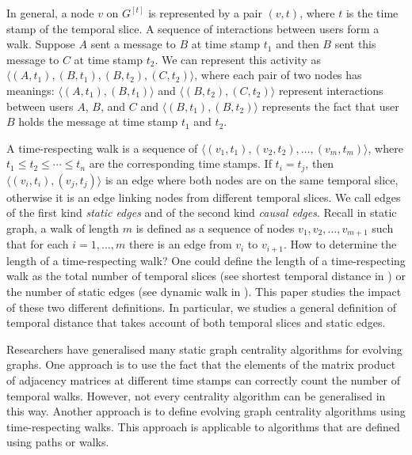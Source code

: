 \documentclass[12pt]{article}
\theoremstyle{definition}
\begin{document}
In general, a node $v$ on $G^{[t]}$ is represented by a pair $(v, t)$, where $t$ is the time stamp of the temporal slice.
A sequence of interactions between users form a walk. Suppose $A$ sent a message to $B$ at time stamp $t_1$
and then $B$ sent this message to $C$ at time stamp $t_2$. We can represent this activity as $\langle (A,t_1), (B,t_1), (B, t_2), (C,t_2)\rangle$, where each pair of two nodes has meanings: $\langle (A,t_1), (B,t_1) \rangle$ and $\langle (B,t_2), (C,t_2) \rangle$ represent interactions between users $A$, $B$, and $C$ and $\langle (B,t_1), (B,t_2) \rangle$ represents the fact that user $B$ holds the message at time stamp $t_1$ and $t_2$.

A time-respecting walk is a sequence of $\langle (v_1, t_1), (v_2, t_2), \ldots ,(v_m, t_m)\rangle$, where $t_1 \le t_2 \le \cdots \le t_n$ are the corresponding time stamps. If $t_i = t_j$, then $\langle (v_i, t_i), (v_j, t_j) \rangle$ is an edge where both nodes are on the same temporal slice,  otherwise it is an edge linking nodes from different temporal slices.
We call edges of the first kind \emph{static edges} and of the second kind \emph{causal edges}.
Recall in static graph, a walk of length $m$ is defined as a sequence of nodes $v_1, v_2, \ldots, v_{m+1}$ such that for each $i = 1, \ldots, m$ there is an edge from $v_i$ to $v_{i+1}$. How to determine the length of a time-respecting walk?
One could define the length of a time-respecting walk as the total number of temporal slices (see shortest temporal distance in \cite{tang09}) or the number of static edges (see dynamic walk in \cite{grindrod11}). This paper studies the impact of these two different definitions. In particular, we studies a general definition of temporal distance that takes account of both temporal slices and static edges.


Researchers have generalised many static graph centrality algorithms for evolving graphs. One approach is to use the fact that the elements of the matrix product of adjacency matrices at different time stamps can correctly count the number of temporal walks.
However, not every centrality algorithm can be generalised in this way. Another approach is to define evolving graph centrality algorithms using time-respecting walks. This approach is applicable to algorithms that are defined using paths or walks.


\end{document}
